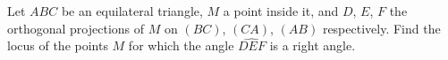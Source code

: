 Let $ABC$ be an equilateral triangle, $M$ a point inside it, and $D$, $E$, $F$ the orthogonal projections of $M$ on $(BC)$, $(CA)$, $(AB)$ respectively. Find the locus of the points $M$ for which the angle $\widehat{DEF}$ is a right angle.

